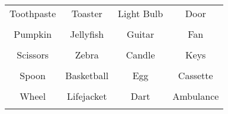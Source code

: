 \documentclass[12pt,a4paper]{article}
\begin{document}
\thispagestyle{empty}
\begin{table}[]
\centering
\Huge
\begin{tabular}{cccc}
 Toothpaste& Toaster& Light Bulb& Door\\  & & & \\
 Pumpkin& Jellyfish& Guitar& Fan\\  & & & \\
 Scissors& Zebra& Candle& Keys\\  & & & \\
 Spoon& Basketball& Egg& Cassette\\  & & & \\
 Wheel& Lifejacket& Dart& Ambulance\\  & & & \\
\end{tabular}
\end{table}
\end{document}
